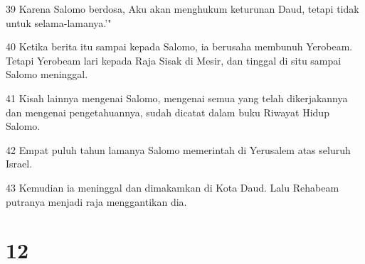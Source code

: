 \par 39 Karena Salomo berdosa, Aku akan menghukum keturunan Daud, tetapi tidak untuk selama-lamanya.'"
\par 40 Ketika berita itu sampai kepada Salomo, ia berusaha membunuh Yerobeam. Tetapi Yerobeam lari kepada Raja Sisak di Mesir, dan tinggal di situ sampai Salomo meninggal.
\par 41 Kisah lainnya mengenai Salomo, mengenai semua yang telah dikerjakannya dan mengenai pengetahuannya, sudah dicatat dalam buku Riwayat Hidup Salomo.
\par 42 Empat puluh tahun lamanya Salomo memerintah di Yerusalem atas seluruh Israel.
\par 43 Kemudian ia meninggal dan dimakamkan di Kota Daud. Lalu Rehabeam putranya menjadi raja menggantikan dia.

\chapter{12}

